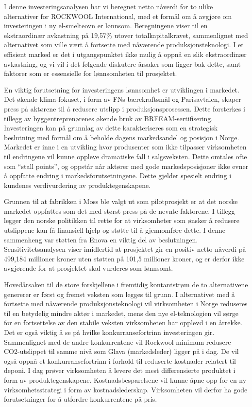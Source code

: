 I denne investeringsanalysen har vi beregnet netto nåverdi for to ulike alternativer for ROCKWOOL International, med et formål om å avgjøre om investeringen i ny el-smelteovn er lønnsom. Beregningene viser til en ekstraordinær avkastning på 19,57\% utover totalkapitalkravet, sammenlignet med alternativet som ville vært å fortsette med nåværende produksjonsteknologi. I et effisient marked er det i utgangspunktet ikke mulig å oppnå en slik ekstraordinær avkastning, og vi vil i det følgende diskutere årsaker som ligger bak dette, samt faktorer som er essensielle for lønnsomheten til prosjektet. 

\indent \newline
En viktig forutsetning for investeringens lønnsomhet er utviklingen i markedet. Det økende klima-fokuset, i form av FNs bærekraftsmål og Parisavtalen, skaper press på aktørene til å redusere utslipp i produksjonsprosessen. Dette forsterkes i tillegg av byggentreprenørenes økende bruk av BREEAM-sertifisering. Investeringen kan på grunnlag av dette karakteriseres som en strategisk beslutning med formål om å beholde dagens markedsandel og posisjon i Norge. Markedet er inne i en utvikling hvor produsenter som ikke tilpasser virksomheten til endringene vil kunne oppleve dramatiske fall i salgsveksten. Dette omtales ofte som “stall points”, og oppstår når aktører med gode markedsposisjoner ikke evner å oppfatte endring i markedsforutsetningene. Dette gjelder spesielt endring i kundenes verdivurdering av produktegenskapene. 

\indent \newline
Grunnen til at fabrikken i Moss ble valgt ut som pilotprosjekt er at det norske markedet oppfattes som det med størst press på de nevnte faktorene. I tillegg legger den norske politikken til rette for at virksomheter som ønsker å redusere utslippene kan få finansiell hjelp og støtte til å gjennomføre dette. I denne sammenheng var støtten fra Enova en viktig del av beslutningen. Sensitivitetsanalysen viser imidlertid at prosjektet gir en positiv netto nåverdi på 499,184 millioner kroner uten støtten på 101,5 millioner kroner, og er derfor ikke avgjørende for at prosjektet skal vurderes som lønnsomt. 

\indent \newline
Hovedårsaken til de store forskjellene i fremtidig kontantstrøm de to alternativene genererer er først og fremst veksten som legges til grunn. I alternativet med å fortsette med nåværende produksjonsteknologi vil virksomheten i Norge reduseres til en betydelig mindre aktør i markedet, mens den nye el-teknologien vil sørge for en fortsettelse av den stabile veksten virksomheten har opplevd i en årrekke. Det er også viktig å se på hvilke konkurransefortrinn investeringen gir. Sammenlignet med de andre konkurrentene vil Rockwool minimum redusere CO2-utslippet til samme nivå som Glava (markedsleder) ligger på i dag. De vil også oppnå et konkurransefortrinn i forhold til reduserte kostnader relatert til deponi. I dag prøver virksomheten å levere det mest differensierte produktet i form av produktegenskapene. Kostnadsbesparelsene vil kunne åpne opp for en ny virksomhetsstrategi i form av kostnadslederskap. Virksomheten vil derfor ha gode forutsetninger for å utfordre konkurrentene på pris.

